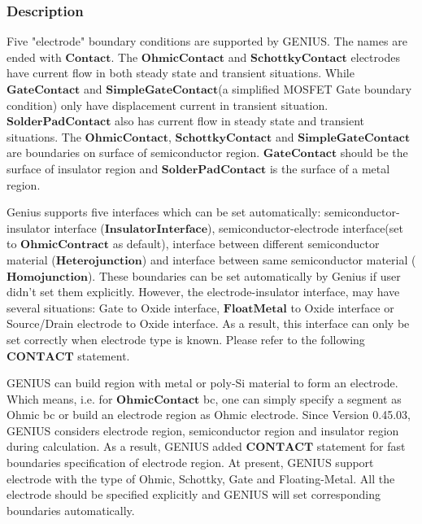 \documentclass[oneside,12pt]{cgd_book}
\begin{document}
\subsubsection{Description}
Five "electrode" boundary conditions are supported by GENIUS. The names are ended with
$\mathbf{Contact}$. The $\mathbf{OhmicContact}$ and $\mathbf{SchottkyContact}$
electrodes have current flow in both steady state and transient situations. While
$\mathbf{GateContact}$ and $\mathbf{SimpleGateContact}$(a simplified MOSFET Gate
          boundary condition) only have displacement current in transient situation.
$\mathbf{SolderPadContact}$ also has current flow in steady state and transient situations. The
$\mathbf{OhmicContact}$, $\mathbf{SchottkyContact}$ and $\mathbf{SimpleGateContact}$
are boundaries on surface of semiconductor region. $\mathbf{GateContact}$
should be the surface of insulator region and $\mathbf{SolderPadContact}$
is the surface of a metal region.
\par
Genius supports five interfaces which can be set automatically: semiconductor-insulator interface
          ($\mathbf{InsulatorInterface}$), semiconductor-electrode interface(set to
$\mathbf{OhmicContract}$ as default), interface between different semiconductor material
          ($\mathbf{Heterojunction}$) and interface between same semiconductor material
          ($\mathbf{Homojunction}$). These boundaries can be set automatically by Genius if user didn't set
          them explicitly. However, the electrode-insulator interface, may have several situations: Gate to Oxide
          interface, $\mathbf{FloatMetal}$ to Oxide interface or Source/Drain electrode to Oxide interface.
          As a result, this interface can only be set correctly when electrode type is known. Please refer to the
          following $\mathbf{CONTACT}$ statement.
\par
GENIUS can build region with metal or poly-Si material to form an electrode. Which means, i.e. for
$\mathbf{OhmicContact}$ bc, one can simply specify a segment as Ohmic bc or build an electrode
          region as Ohmic electrode. Since Version 0.45.03, GENIUS considers electrode region, semiconductor region and
          insulator region during calculation. As a result, GENIUS added
$\mathbf{CONTACT}$ statement for fast
          boundaries specification of electrode region. At present, GENIUS support electrode with the type of Ohmic,
          Schottky, Gate and Floating-Metal. All the electrode should be specified explicitly and GENIUS will set
          corresponding boundaries automatically.
\end{document}
